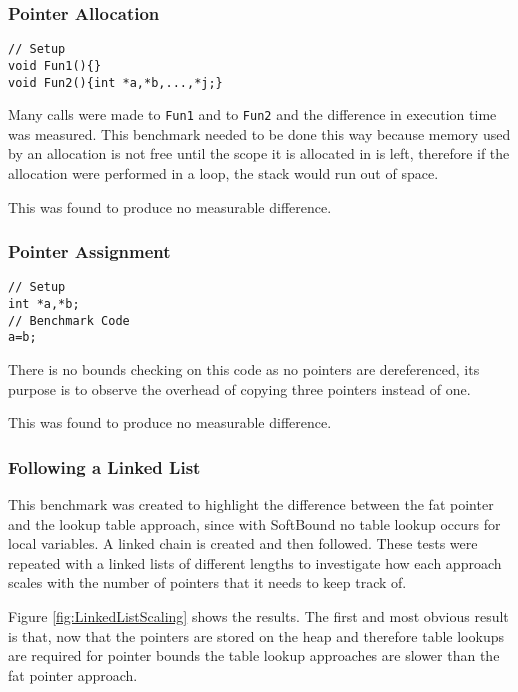 \subsubsection{Pointer Allocation}


\begin{verbatim}
// Setup
void Fun1(){}
void Fun2(){int *a,*b,...,*j;}
\end{verbatim}

Many calls were made to \verb!Fun1! and to \verb!Fun2! and the difference in execution time was measured.
This benchmark needed to be done this way because memory used by an allocation is not free until the scope it is allocated in is left, therefore if the allocation were performed in a loop, the stack would run out of space.

This was found to produce no measurable difference.

\subsubsection{Pointer Assignment}

\begin{verbatim}
// Setup
int *a,*b;
// Benchmark Code
a=b;
\end{verbatim}

There is no bounds checking on this code as no pointers are dereferenced, its purpose is to observe the overhead of copying three pointers instead of one.

This was found to produce no measurable difference.

\subsubsection{Following a Linked List}

This benchmark was created to highlight the difference between the fat pointer and the lookup table approach, since with SoftBound no table lookup occurs for local variables.
A linked chain is created and then followed.
These tests were repeated with a linked lists of different lengths to investigate how each approach scales with the number of pointers that it needs to keep track of.



Figure \ref{fig:LinkedListScaling} shows the results.
The first and most obvious result is that, now that the pointers are stored on the heap and therefore table lookups are required for pointer bounds the table lookup approaches are slower than the fat pointer approach.

